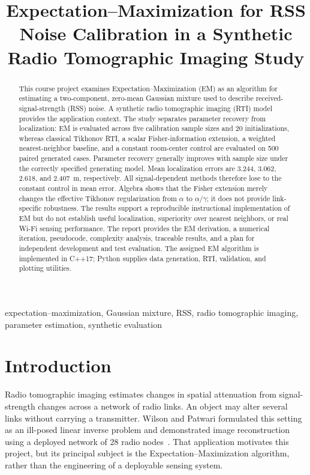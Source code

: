 \documentclass[conference,letterpaper]{IEEEtran}
\title{Expectation--Maximization for RSS Noise Calibration in a Synthetic Radio Tomographic Imaging Study}
\author{\IEEEauthorblockN{Camilo V\'asquez}
\IEEEauthorblockA{School of Mathematical and Computational Sciences\\
Yachay Tech University\\Urcuqu\'i, Ecuador}}
\begin{document}
\maketitle
\begin{abstract}
This course project examines Expectation--Maximization (EM) as an algorithm for estimating a two-component, zero-mean Gaussian mixture used to describe received-signal-strength (RSS) noise. A synthetic radio tomographic imaging (RTI) model provides the application context. The study separates parameter recovery from localization: EM is evaluated across five calibration sample sizes and 20 initializations, whereas classical Tikhonov RTI, a scalar Fisher-information extension, a weighted nearest-neighbor baseline, and a constant room-center control are evaluated on 500 paired generated cases. Parameter recovery generally improves with sample size under the correctly specified generating model. Mean localization errors are 3.244, 3.062, 2.618, and 2.407~m, respectively. All signal-dependent methods therefore lose to the constant control in mean error. Algebra shows that the Fisher extension merely changes the effective Tikhonov regularization from $\alpha$ to $\alpha/\gamma$; it does not provide link-specific robustness. The results support a reproducible instructional implementation of EM but do not establish useful localization, superiority over nearest neighbors, or real Wi-Fi sensing performance. The report provides the EM derivation, a numerical iteration, pseudocode, complexity analysis, traceable results, and a plan for independent development and test evaluation. The assigned EM algorithm is implemented in C++17; Python supplies data generation, RTI, validation, and plotting utilities.
\end{abstract}
\begin{IEEEkeywords}
expectation--maximization, Gaussian mixture, RSS, radio tomographic imaging, parameter estimation, synthetic evaluation
\end{IEEEkeywords}

\section{Introduction}
Radio tomographic imaging estimates changes in spatial attenuation from signal-strength changes across a network of radio links. An object may alter several links without carrying a transmitter. Wilson and Patwari formulated this setting as an ill-posed linear inverse problem and demonstrated image reconstruction using a deployed network of 28 radio nodes~\cite{wilson2010}. That application motivates this project, but its principal subject is the Expectation--Maximization algorithm, rather than the engineering of a deployable sensing system.
\end{document}
